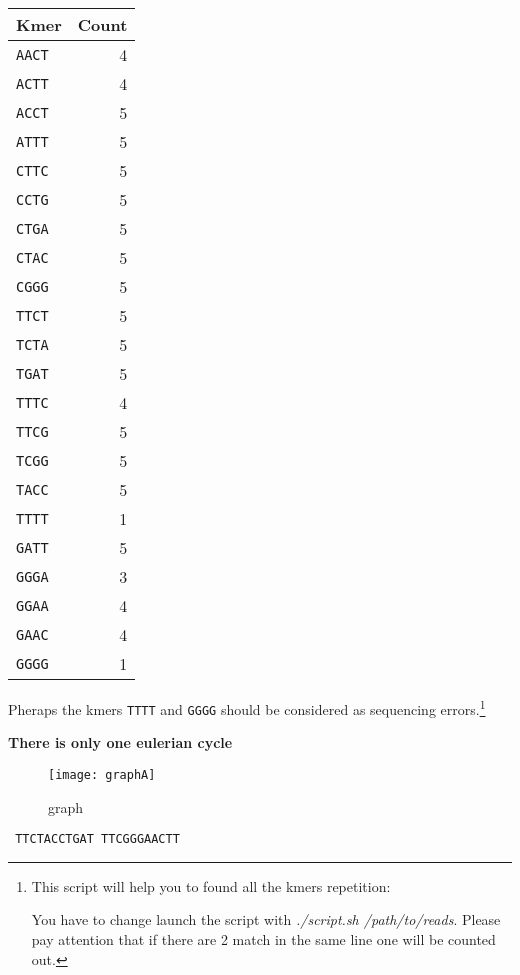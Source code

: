\begin{Answer} [
  ref={exA},
  number={6}
 ]

  \Question

\begin{tabular}{ | l | r | }
  \hline
  \textbf{Kmer} & \textbf{Count} \\ \hline
  \texttt{AACT} & 4 \\ \hline
  \texttt{ACTT} & 4 \\ \hline
  \texttt{ACCT} & 5 \\ \hline
  \texttt{ATTT} & 5 \\ \hline
  \texttt{CTTC} & 5 \\ \hline
  \texttt{CCTG} & 5 \\ \hline
  \texttt{CTGA} & 5 \\ \hline
  \texttt{CTAC} & 5 \\ \hline
  \texttt{CGGG} & 5 \\ \hline
  \texttt{TTCT} & 5 \\ \hline
  \texttt{TCTA} & 5 \\ \hline
  \texttt{TGAT} & 5 \\ \hline
  \texttt{TTTC} & 4 \\ \hline
  \texttt{TTCG} & 5 \\ \hline
  \texttt{TCGG} & 5 \\ \hline
  \texttt{TACC} & 5 \\ \hline
  \texttt{TTTT} & 1 \\ \hline
  \texttt{GATT} & 5 \\ \hline
  \texttt{GGGA} & 3 \\ \hline
  \texttt{GGAA} & 4 \\ \hline
  \texttt{GAAC} & 4 \\ \hline
  \texttt{GGGG} & 1 \\ \hline
\end{tabular}

Pheraps the kmers \texttt{TTTT} and \texttt{GGGG} should be considered as
sequencing errors.\footnote{
This script will help you to found all the kmers repetition:

You have to change launch the script with \textit{./script.sh /path/to/reads}.
Please pay attention that if there are 2 match in the same line one will be
counted out.}


  \Question \textbf{There is only one eulerian cycle}
\begin{figure}[H]
  \centering
  \texttt{[image: graphA]}
  \caption{graph}
\end{figure}

  \Question \texttt{{\color{red} TTC}TACCTGAT{\color{red} TTC}GGGAACTT}
\end{Answer}

